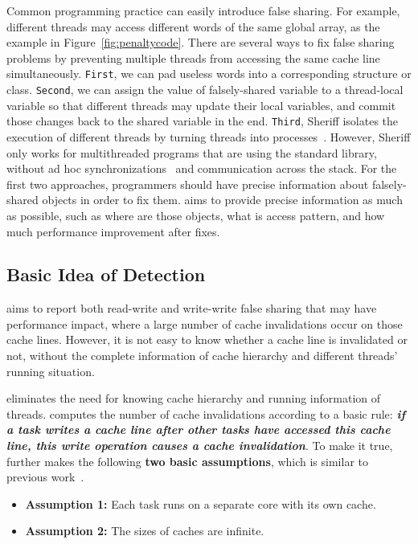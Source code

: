 Common programming practice can easily introduce false sharing. For example, different threads may access different words of the same global array, as the example in Figure~\ref{fig:penaltycode}. There are several ways to fix false sharing problems by preventing multiple threads from accessing the same cache line simultaneously. {\tt First},  we can pad useless words into a corresponding structure or class. {\tt Second}, we can assign the value of falsely-shared variable to a thread-local variable so that different threads may update their local variables, and commit those changes back to the shared variable in the end. {\tt Third}, Sheriff isolates the execution of different threads by turning threads into processes~\cite{sheriff}. However, Sheriff only works for multithreaded programs that are using the standard \pthreads{} library, without ad hoc synchronizations~\cite{Xiong:2010:AHS:1924943.1924955} and communication across the stack. For the first two approaches, programmers should have precise information about falsely-shared objects in order to fix them. \cheetah{} aims to provide precise information as much as possible, such as where are those objects, what is access pattern, and how much performance improvement after fixes. 

\subsection{Basic Idea of Detection}
\label{sec:basicidea}
\cheetah{} aims to report both read-write and write-write false sharing that may have performance impact, where a large number of cache invalidations occur on those cache lines. However, it is not easy to know whether a cache line is invalidated or not, without the complete information of cache hierarchy and different threads' running situation. 

\cheetah{} eliminates the need for knowing cache hierarchy and running information of threads. \cheetah{} computes the number of cache invalidations according to a basic rule: {\it \bf if a task writes a cache line after other tasks have accessed this cache line, this write operation causes a cache invalidation}. To make it true, \cheetah{} further makes the following \textbf{two basic assumptions}, which is similar to previous work~\cite{qinzhao, Predator}.

\begin{itemize} 
\item {\bf Assumption 1:} Each task runs on a separate core with its own cache. 

\item {\bf Assumption 2: } The sizes of caches are infinite. 
 
\end{itemize}

